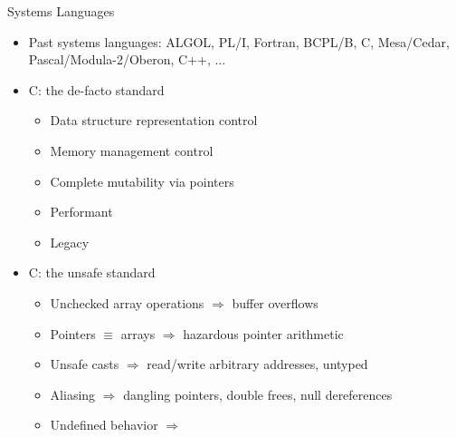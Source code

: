 \documentclass[aspectratio=169]{beamer}
\begin{document}
\begin{frame}{Systems Languages}
\begin{itemize}[<+->]
    \item Past systems languages: \tiny{ALGOL, PL/I, Fortran, BCPL/B, C, Mesa/Cedar, Pascal/Modula-2/Oberon, C++, ...}
    \item C: the de-facto standard
        \begin{itemize}
            \item Data structure representation control 
            \item Memory management control 
            \item Complete mutability via pointers 
            \item Performant
            \item Legacy 
        \end{itemize}
    \item C: the unsafe standard
        \begin{itemize}
            \item Unchecked array operations $\Rightarrow$ buffer overflows
            \item Pointers $\equiv$ arrays $\Rightarrow$ hazardous pointer arithmetic
            \item Unsafe casts $\Rightarrow$ read/write arbitrary addresses, untyped
            \item Aliasing $\Rightarrow$ dangling pointers, double frees, null dereferences
            \item Undefined behavior $\Rightarrow$ 
        \end{itemize}
\end{itemize}
\end{frame}

\end{document}
